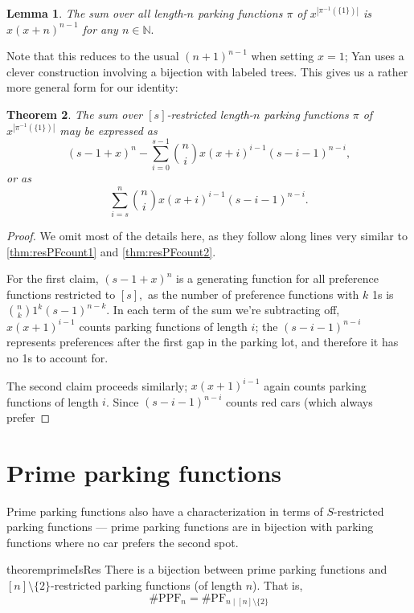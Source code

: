 \documentclass[12 pt]{amsart}
\newtheorem{theorem}{Theorem}[section]
\newtheorem{lemma}[theorem]{Lemma}
\theoremstyle{definition} %
\theoremstyle{remark} %
\begin{document}
\begin{lemma}
    The sum over all length-$n$ parking functions $\pi$ of $x^{|\pi^{-1}(\{1\})|}$ is $x(x+n)^{n-1}$ for any $n\in\mathbb{N}.$
\end{lemma}

Note that this reduces to the usual $(n+1)^{n-1}$ when setting $x=1$; Yan uses a clever construction involving a bijection with labeled trees. This gives us a rather more general form for our identity:

\begin{theorem}
    \label{thm:res-1s-enumerator}
    The sum over $[s]$-restricted length-$n$ parking functions $\pi$ of $x^{|\pi^{-1}(\{1\})|}$ may be expressed as
    \[(s-1+x)^{n} - \sum_{i = 0}^{s - 1} \binom{n}{i} x(x + i)^{i - 1} (s - i - 1)^{n - i},\]
    or as
    \[\sum_{i = s}^{n} \binom{n}{i} x(x + i)^{i - 1} (s - i - 1)^{n - i}.\]
\end{theorem}

\begin{proof}
    We omit most of the details here, as they follow along lines very similar to \cref{thm:resPFcount1} and \cref{thm:resPFcount2}.
    
    For the first claim, $(s-1+x)^n$ is a generating function for all preference functions restricted to $[s],$ as the number of preference functions with $k$ 1s is $\binom{n}{k}1^k(s-1)^{n-k}.$ In each term of the sum we're subtracting off, $x(x+1)^{i-1}$ counts parking functions of length $i$; the $(s-i-1)^{n-i}$ represents preferences after the first gap in the parking lot, and therefore it has no 1s to account for.

    The second claim proceeds similarly; $x(x+1)^{i-1}$ again counts parking functions of length $i$. Since $(s-i-1)^{n-i}$ counts red cars (which always prefer
\end{proof}

\section{Prime parking functions}

Prime parking functions also have a characterization in terms of $S$-restricted parking functions --- prime parking functions are in bijection with parking functions where no car prefers the second spot.

\begin{restatable}{theorem}{primeIsRes}
	There is a bijection between prime parking functions and $[n] \setminus \{ 2 \}$-restricted parking functions (of length $n$). That is,
	\[
		\# \mathrm{PPF}_{n} = \# \mathrm{PF}_{n \mid [n] \setminus \{ 2 \}} 
	\]
\end{restatable}
\end{document}
